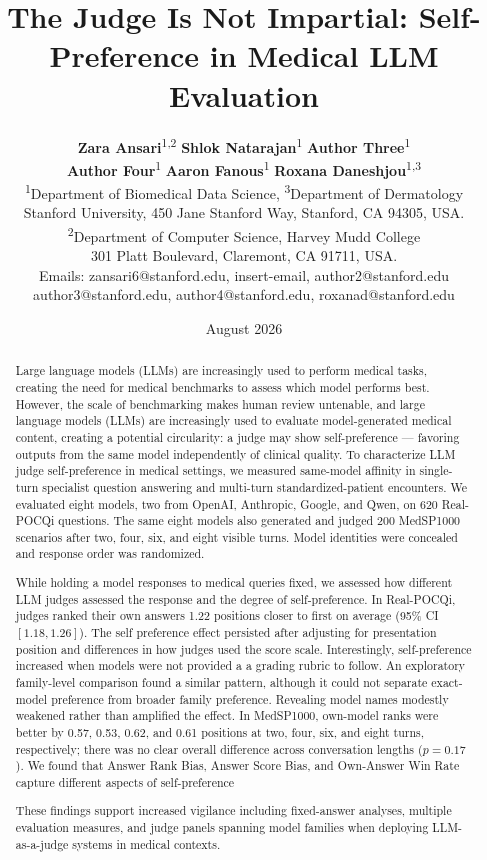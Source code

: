 \documentclass[11pt]{article}
\title{The Judge Is Not Impartial: Self-Preference in Medical LLM Evaluation}
\author{%
\begin{tabular}{c}
\textbf{Zara Ansari}\textsuperscript{1,2}
\hspace{1em}
\textbf{Shlok Natarajan}\textsuperscript{1}
\hspace{1em}
\textbf{Author Three}\textsuperscript{1}
\\[0.25em]
\textbf{Author Four}\textsuperscript{1}
\hspace{1em}
\textbf{Aaron Fanous}\textsuperscript{1}
\hspace{1em}
\textbf{Roxana Daneshjou}\textsuperscript{1,3}
\\[0.7em]
\small
\textsuperscript{1}Department of Biomedical Data Science,
\textsuperscript{3}Department of Dermatology
\\
\small
Stanford University, 450 Jane Stanford Way,
Stanford, CA 94305, USA.
\\
\small
\textsuperscript{2}Department of Computer Science,
Harvey Mudd College
\\
\small
301 Platt Boulevard, Claremont, CA 91711, USA.
\\[0.6em]
\small
Emails: zansari6@stanford.edu,
insert-email,
author2@stanford.edu
\\
\small
author3@stanford.edu,
author4@stanford.edu,
roxanad@stanford.edu
\end{tabular}%
}
\date{August 2026}
\begin{document}
\maketitle

\begin{abstract}

Large language models (LLMs) are increasingly used to perform medical tasks, creating the need for medical benchmarks to assess which model performs best. However, the scale of benchmarking makes human review untenable, and large language models (LLMs) are increasingly used to evaluate model-generated medical content, creating a potential circularity: a judge may show self-preference --- favoring outputs from the same model independently of clinical quality. To characterize LLM judge self-preference in medical settings, we measured same-model affinity in single-turn specialist question answering and
multi-turn standardized-patient encounters. We evaluated eight models, two from OpenAI, Anthropic, Google, and Qwen, on 620 Real-POCQi questions. The same eight models also generated and judged 200 MedSP1000 scenarios after two, four, six, and eight visible turns. Model identities were concealed and response order was randomized.

 While holding a model responses to medical queries fixed, we assessed how different LLM judges assessed the response and the degree of self-preference. In Real-POCQi, judges ranked their own answers 1.22 positions closer to first on average (95\% CI $[1.18,1.26]$). The self preference effect persisted after adjusting for presentation
position and differences in how judges used the score scale. Interestingly, self-preference increased when models were not provided a a grading rubric to follow. An exploratory family-level comparison found a similar pattern, although it
could not separate exact-model preference from broader family preference.
Revealing model names
modestly weakened rather than amplified the effect. In MedSP1000, own-model
ranks were better by 0.57, 0.53, 0.62, and 0.61 positions at two, four,
six, and eight turns, respectively; there was no clear overall difference
across conversation lengths ($p=0.17$). We found that Answer Rank Bias, Answer Score Bias, and Own-Answer Win Rate capture different aspects of self-preference

These findings support increased vigilance including fixed-answer analyses, multiple evaluation measures,
and judge panels spanning model families when deploying LLM-as-a-judge systems in medical contexts.

\end{abstract}
\end{document}
